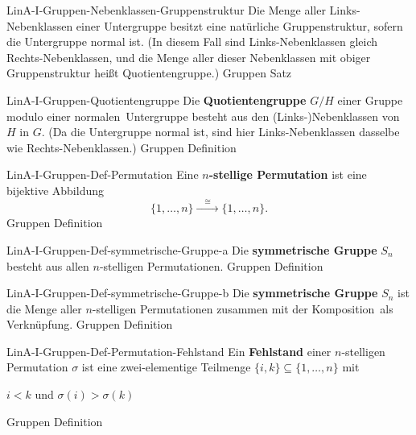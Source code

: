 \documentclass[10pt]{article}
\begin{document}
\begin{note}{LinA-I-Gruppen-Nebenklassen-Gruppenstruktur}
  \field
  \field
  Die Menge aller Links-Nebenklassen einer Untergruppe besitzt eine natürliche Gruppenstruktur, sofern die Untergruppe normal ist.\clend
  \field
  (In diesem Fall sind Links-Nebenklassen gleich Rechts-Nebenklassen, und die Menge aller dieser Nebenklassen mit obiger Gruppenstruktur heißt Quotientengruppe.)
  \field Gruppen
  \field Satz  
\end{note}

\begin{note}{LinA-I-Gruppen-Quotientengruppe}
  \field
  \field
  Die \textbf{Quotientengruppe} \(G/H\) einer Gruppe modulo einer normalen\clend\ Untergruppe besteht aus den (Links-)Nebenklassen von \(H\) in \(G\).\clend
  \field
  (Da die Untergruppe normal ist, sind hier Links-Nebenklassen dasselbe wie Rechts-Nebenklassen.)
  \field Gruppen
  \field Definition
\end{note}

\begin{note}{LinA-I-Gruppen-Def-Permutation}
  \field
  \field
  Eine \textbf{\(n\)-stellige Permutation} ist eine bijektive Abbildung
  \[
    \{1,\dots, n\} \xrightarrow{\quad\cong\quad} \{1,\dots,n\}.
  \]
  \clend
  \field
  \field Gruppen
  \field Definition  
\end{note}

\begin{note}{LinA-I-Gruppen-Def-symmetrische-Gruppe-a}
  \field
  \field
  Die \textbf{symmetrische Gruppe} \(S_n\) besteht aus allen \(n\)-stelligen Permutationen.\clend
  \field
  \field Gruppen
  \field Definition
\end{note}

\begin{note}{LinA-I-Gruppen-Def-symmetrische-Gruppe-b}
  \field
  \field
  Die \textbf{symmetrische Gruppe} \(S_n\) ist die Menge aller \(n\)-stelligen Permutationen zusammen mit der Komposition\clend\ als Verknüpfung.
  \field
  \field Gruppen
  \field Definition  
\end{note}

\begin{note}{LinA-I-Gruppen-Def-Permutation-Fehlstand}
  \field
  \field
  Ein \textbf{Fehlstand} einer \(n\)-stelligen Permutation \(\sigma\) ist eine zwei-elementige Teilmenge \(\{i,k\}\subseteq\{1,\dots, n\}\) mit
  \begin{center}
    \par
     \(i < k\)  und  \(\sigma(i) > \sigma(k)\)
  \end{center}
  \clend
  \field
  \field Gruppen
  \field Definition 
\end{note}
\end{document}
